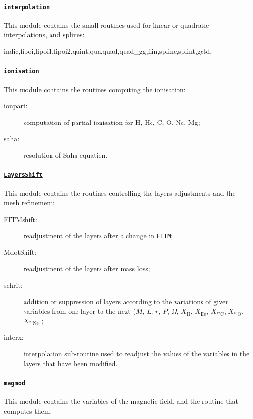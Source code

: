 \documentclass[11pt]{article}
\begin{document}
\paragraph{\underline{\texttt{interpolation}}}
This module contains the small routines used for linear or quadratic interpolations, and splines:

\begin{description}
 \item[indic,fipoi,fipoi1,fipoi2,quint,qua,quad,quad\_gg,flin,spline,splint,getd.]
 \end{description}

\paragraph{\underline{\texttt{ionisation}}}
This module contains the routines computing the ionisation:

\begin{description}
 \item[ionpart:] computation of partial ionisation for H, He, C, O, Ne, Mg;
 \item[saha:] resolution of Saha equation.
 \end{description}

\paragraph{\underline{\texttt{LayersShift}}}
This module contains the routines controlling the layers adjustments and the mesh refinement:

\begin{description}
 \item[FITMshift:] readjustment of the layers after a change in \texttt{FITM};
 \item[MdotShift:] readjustment of the layers after mass loss;
 \item[schrit:] addition or suppression of layers according to the variations of given variables from one layer to the next ($M$, $L$, $r$, $P$, $\Omega$, $X_\text{H}$, $X_\text{He}$, $X_{^{12}\text{C}}$, $X_{^{16}\text{O}}$, $X_{^{20}\text{Ne}}$ ;
 \item[interx:] interpolation sub-routine used to readjust the values of the variables in the layers that have been modified.
 \end{description}

\paragraph{\underline{\texttt{magmod}}}
This module contains the variables of the magnetic field, and the routine that computes them:
\end{document}
